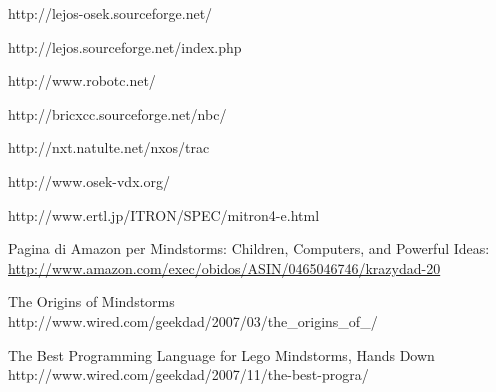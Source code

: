 \begin{thebibliography}{99}

            {http://lejos-osek.sourceforge.net/}

            {http://lejos.sourceforge.net/index.php}

            {http://www.robotc.net/}

            {http://bricxcc.sourceforge.net/nbc/}

            {http://nxt.natulte.net/nxos/trac}

            {http://www.osek-vdx.org/}

            {http://www.ertl.jp/ITRON/SPEC/mitron4-e.html}

    Pagina di Amazon per Mindstorms: Children, Computers, and Powerful
    Ideas: \\
    \url{http://www.amazon.com/exec/obidos/ASIN/0465046746/krazydad-20}

          {The Origins of Mindstorms}
          {http://www.wired.com/geekdad/2007/03/the_origins_of_/}

          {The Best Programming Language for Lego Mindstorms, Hands Down}
          {http://www.wired.com/geekdad/2007/11/the-best-progra/}

\end{thebibliography}
